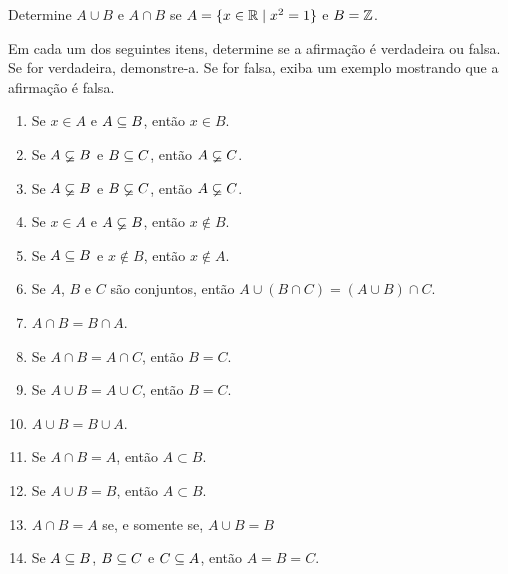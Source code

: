 \documentclass[12pt]{exam}
\begin{document}
    \vspace{.3cm}

    \questao{} Determine $A \cup B$ e $A \cap B$ se $A = \{x \in \mathbb{R} \mid x^2 = 1\}$ e $B = \mathbb{Z}$.

    \vspace{.3cm}

    \questao{} Em cada um dos seguintes itens, determine se a afirma\c{c}\~ao \'e
    verdadeira ou falsa. Se for verdadeira, demonstre-a. Se for falsa, exiba um
    exemplo mostrando que a afirma\c{c}\~ao \'e falsa.
    \begin{enumerate}[label={\alph*})]
        \item Se $x \in A$ e $A \subseteq B$, ent\~ao $x \in B$.

        \item Se $A \varsubsetneq B$ e $B \subseteq C$, ent\~ao $A \varsubsetneq C$.

        \item Se $A \varsubsetneq B$ e $B \varsubsetneq C$, ent\~ao $A \varsubsetneq C$.

        \item Se $x \in A$ e $A \varsubsetneq B$, ent\~ao $x \notin B$.

        \item Se $A \subseteq B$ e $x \notin B$, ent\~ao $x \notin A$.

        \item Se $A$, $B$ e $C$ s\~ao conjuntos, ent\~ao $A \cup (B \cap C) = (A \cup B) \cap C$.

        \item $A \cap B = B \cap A$.

        \item Se $A \cap B = A \cap C$, então $B = C$.

        \item Se $A \cup B = A \cup C$, então $B = C$.

        \item $A \cup B = B \cup A$.

        \item Se $A \cap B = A$, então $A \subset B$.

        \item Se $A \cup B = B$, então $A \subset B$.

        \item $A \cap B = A$ se, e somente se, $A \cup B = B$

        \item Se $A \subseteq B$, $B \subseteq C$ e $C \subseteq A$, então $A = B = C$.
    \end{enumerate}
\end{document}
